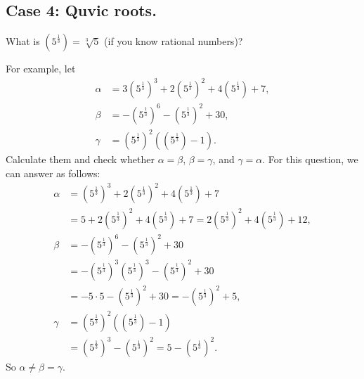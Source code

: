 \subsection{Case 4: Quvic roots.}
What is $\left(5^{\frac{1}{3}}\right)=\sqrt[3]{5}$
(if you know rational numbers)?

For example, let
\begin{align*}
  \alpha &= 3\left(5^{\frac{1}{3}}\right)^3+2\left(5^{\frac{1}{3}}\right)^2+4 \left(5^{\frac{1}{3}}\right)+ 7,\\
  \beta &= -\left(5^{\frac{1}{3}}\right)^6 -\left(5^{\frac{1}{3}}\right)^2+30,\\
  \gamma &= \left(5^{\frac{1}{3}}\right)^2(\left(5^{\frac{1}{3}}\right) - 1).
\end{align*}
Calculate them and check whether $\alpha=\beta$, $\beta=\gamma$,
and $\gamma=\alpha$.
For this question, we can answer as follows:
\begin{align*}
  \alpha &= \left(5^{\frac{1}{3}}\right)^3+2\left(5^{\frac{1}{3}}\right)^2+4 \left(5^{\frac{1}{3}}\right)+ 7\\
  &=5+2\left(5^{\frac{1}{3}}\right)^2+4 \left(5^{\frac{1}{3}}\right)+ 7
  =2\left(5^{\frac{1}{3}}\right)^2+4 \left(5^{\frac{1}{3}}\right)+ 12,\\
  \beta &= -\left(5^{\frac{1}{3}}\right)^6 -\left(5^{\frac{1}{3}}\right)^2+30\\
   &= -\left(5^{\frac{1}{3}}\right)^3\left(5^{\frac{1}{3}}\right)^3 -\left(5^{\frac{1}{3}}\right)^2+30\\
   &= -5\cdot 5 -\left(5^{\frac{1}{3}}\right)^2+30
   = -\left(5^{\frac{1}{3}}\right)^2+5,\\
  \gamma &= \left(5^{\frac{1}{3}}\right)^2(\left(5^{\frac{1}{3}}\right) - 1)\\
  &= \left(5^{\frac{1}{3}}\right)^3 - \left(5^{\frac{1}{3}}\right)^2
  =5 - \left(5^{\frac{1}{3}}\right)^2.
\end{align*}
So $\alpha\neq \beta=\gamma$.

